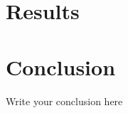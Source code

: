 \documentclass[12pt]{article}
\begin{document}
\section{Results}




\section{Conclusion}

Write your conclusion here



\end{document}
